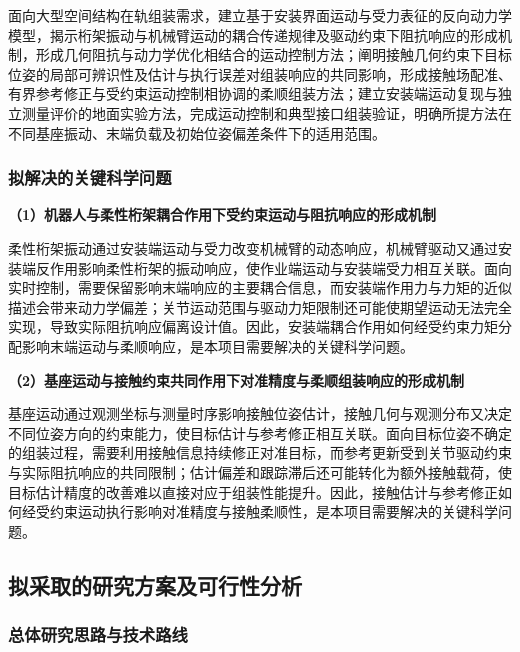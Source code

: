 \documentclass[UTF8,a4paper,zihao=-4,fontset=fandol]{ctexart}
\newcommand{\topic}[1]{\par\Needspace{4\baselineskip}\addvspace{0.5em}\noindent\textbf{#1}\par\nobreak}
\newcommand{\rev}[1]{{\color{red}#1}}
\begin{document}
面向大型空间结构在轨组装需求，建立基于安装界面运动与受力\rev{表征}的\rev{反向}动力学\rev{模型}，揭示桁架振动\rev{与机械臂运动的耦合传递规律及}驱动约束\rev{下阻抗}响应的\rev{形成机制}，形成几何阻抗与动力学优化相结合的运动控制方法；\rev{阐明接触几何约束下目标位姿的}局部\rev{可辨识性及估计与执行}误差对组装响应的\rev{共同}影响，\rev{形成}接触\rev{场配准、有界}参考修正与\rev{受约束运动控制相协调}的柔顺组装方法；\rev{建立安装端运动复现}与\rev{独立测量评价的地面}实验\rev{方法}，\rev{完成运动控制和典型接口组装}验证\rev{，明确}所提方法在不同基座振动、末端负载及初始位姿偏差条件下的适用范围。

\subsubsection{拟解决的关键科学问题}

\topic{（1）机器人与柔性桁架耦合作用下受约束运动与阻抗响应的形成机制}

柔性桁架振动通过安装端运动与受力改变机械臂的动态响应，机械臂驱动又通过安装端反作用影响柔性桁架的振动响应，使作业端运动与安装端受力相互关联。面向实时控制，需要保留影响末端响应的主要耦合信息，而安装端作用力与力矩的近似描述会带来动力学偏差；关节运动范围与驱动力矩限制还可能使期望运动无法完全实现，导致实际阻抗响应偏离设计值。因此，安装端耦合作用如何经受约束力矩分配影响末端运动与柔顺响应，是本项目需要解决的关键科学问题。


\topic{（2）基座运动\rev{与接触约束共同作用}下\rev{对准精度与柔顺组装响应的形成机制}}

\rev{基座运动通过观测坐标与测量时序影响}接触\rev{位姿}估计\rev{，接触几何与观测分布又决定不同位姿方向的约束能力，使目标估计}与参考修正\rev{相互关联。面向目标位姿不确定的}组装\rev{过程，需要利用接触信息持续修正对准目标，而参考更新受到关节驱动约束与实际阻抗}响应的\rev{共同限制；}估计\rev{偏差}和跟踪\rev{滞后还可能转化为额外接触载荷}，\rev{使目标}估计精度的改善\rev{难以}直接\rev{对应于组装性能提升。因此，接触估计与参考修正如何经受约束运动执行影响对准精度与接触柔顺性，是本项目需要解决}的\rev{关键科学问题}。

\subsection{拟采取的研究方案及可行性分析}

\subsubsection{总体研究思路与技术路线}
\end{document}
